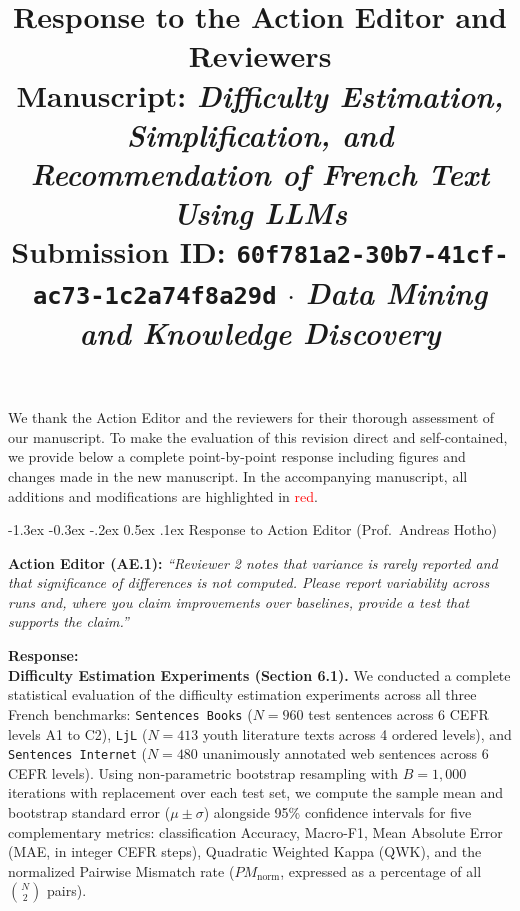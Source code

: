 \documentclass[11pt,a4paper]{article}
\title{\vspace{-1.2cm}\textbf{\large Response to the Action Editor and Reviewers}\\[0.2em]
\normalsize Manuscript: \textit{Difficulty Estimation, Simplification, and Recommendation of French Text Using LLMs}\\
\small Submission ID: \texttt{60f781a2-30b7-41cf-ac73-1c2a74f8a29d} $\cdot$ \textit{Data Mining and Knowledge Discovery}}
\date{\vspace{-0.8cm}}
\makeatletter
\renewcommand\section{\@startsection {section}{1}{\z@}%
  {-1.3ex \@plus -0.3ex \@minus -.2ex}%
  {0.5ex \@plus.1ex}%
  {\normalfont\large\bfseries}}
\makeatother
\begin{document}
\maketitle

\medskip
\noindent
We thank the Action Editor and the reviewers for their thorough assessment of our manuscript. To make the evaluation of this revision direct and self-contained, we provide below a complete point-by-point response including figures and changes made in the new manuscript. In the accompanying manuscript, all additions and modifications are highlighted in \textcolor{red}{red}.

\section{Response to Action Editor (Prof.\ Andreas Hotho)}

\begin{reviewbox}
\textbf{Action Editor (AE.1):} \textit{``Reviewer 2 notes that variance is rarely reported and that significance of differences is not computed. Please report variability across runs and, where you claim improvements over baselines, provide a test that supports the claim.''}
\end{reviewbox}

\noindent\textbf{Response:}\\
\noindent\textbf{Difficulty Estimation Experiments (Section 6.1).} We conducted a complete statistical evaluation of the difficulty estimation experiments across all three French benchmarks: \texttt{Sentences Books} ($N = 960$ test sentences across 6 CEFR levels A1 to C2), \texttt{LjL} ($N = 413$ youth literature texts across 4 ordered levels), and \texttt{Sentences Internet} ($N = 480$ unanimously annotated web sentences across 6 CEFR levels). Using non-parametric bootstrap resampling with $B = 1{,}000$ iterations with replacement over each test set, we compute the sample mean and bootstrap standard error ($\mu \pm \sigma$) alongside 95\% confidence intervals for five complementary metrics: classification Accuracy, Macro-F1, Mean Absolute Error (MAE, in integer CEFR steps), Quadratic Weighted Kappa (QWK), and the normalized Pairwise Mismatch rate ($PM_{\text{norm}}$, expressed as a percentage of all $\binom{N}{2}$ pairs).
\end{document}
